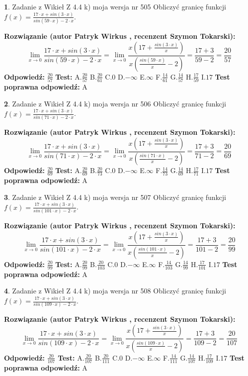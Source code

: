 \documentclass[12pt, a4paper]{article}
\theoremstyle{definition} %
\newtheorem{zad}{}
\newcommand{\zadStart}[1]{\begin{zad}#1\newline}
\newcommand{\zadStop}{\end{zad}}
\newcommand{\rozwStart}[2]{\noindent \textbf{Rozwiązanie (autor #1 , recenzent #2): }\newline}
\newcommand{\rozwStop}{\newline}
\newcommand{\odpStart}{\noindent \textbf{Odpowiedź:}\newline}
\newcommand{\odpStop}{\newline}
\newcommand{\testStart}{\noindent \textbf{Test:}\newline}
\newcommand{\testStop}{\newline}
\newcommand{\kluczStart}{\noindent \textbf{Test poprawna odpowiedź:}\newline}
\newcommand{\kluczStop}{\newline}
\begin{document}
\zadStart{Zadanie z Wikieł Z 4.4 k) moja wersja nr 505}
Obliczyć granicę funkcji $f(x)=\frac{17\cdot x +sin(3\cdot x)}{sin(59\cdot x) -2\cdot x}$.
\zadStop
\rozwStart{Patryk Wirkus}{Szymon Tokarski}
$$\lim\limits_{x\to 0}\frac{17\cdot x +sin(3\cdot x)}{sin(59\cdot x) -2\cdot x}
=\lim\limits_{x\to 0}\frac{x(17+\frac{sin(3\cdot x)}{x})}{x(\frac{sin(59\cdot x)}{x}-2)}
=\frac{17+3}{59-2} = \frac{20}{57}$$
\rozwStop
\odpStart
$\frac{20}{57}$
\odpStop
\testStart
A.$\frac{20}{57}$
B.$\frac{20}{61}$
C.$0$
D.$-\infty$
E.$\infty$
F.$\frac{14}{61}$
G.$\frac{14}{57}$
H.$\frac{17}{59}$
I.$17$
\testStop
\kluczStart
A
\kluczStop



\zadStart{Zadanie z Wikieł Z 4.4 k) moja wersja nr 506}
Obliczyć granicę funkcji $f(x)=\frac{17\cdot x +sin(3\cdot x)}{sin(71\cdot x) -2\cdot x}$.
\zadStop
\rozwStart{Patryk Wirkus}{Szymon Tokarski}
$$\lim\limits_{x\to 0}\frac{17\cdot x +sin(3\cdot x)}{sin(71\cdot x) -2\cdot x}
=\lim\limits_{x\to 0}\frac{x(17+\frac{sin(3\cdot x)}{x})}{x(\frac{sin(71\cdot x)}{x}-2)}
=\frac{17+3}{71-2} = \frac{20}{69}$$
\rozwStop
\odpStart
$\frac{20}{69}$
\odpStop
\testStart
A.$\frac{20}{69}$
B.$\frac{20}{73}$
C.$0$
D.$-\infty$
E.$\infty$
F.$\frac{14}{73}$
G.$\frac{14}{69}$
H.$\frac{17}{71}$
I.$17$
\testStop
\kluczStart
A
\kluczStop



\zadStart{Zadanie z Wikieł Z 4.4 k) moja wersja nr 507}
Obliczyć granicę funkcji $f(x)=\frac{17\cdot x +sin(3\cdot x)}{sin(101\cdot x) -2\cdot x}$.
\zadStop
\rozwStart{Patryk Wirkus}{Szymon Tokarski}
$$\lim\limits_{x\to 0}\frac{17\cdot x +sin(3\cdot x)}{sin(101\cdot x) -2\cdot x}
=\lim\limits_{x\to 0}\frac{x(17+\frac{sin(3\cdot x)}{x})}{x(\frac{sin(101\cdot x)}{x}-2)}
=\frac{17+3}{101-2} = \frac{20}{99}$$
\rozwStop
\odpStart
$\frac{20}{99}$
\odpStop
\testStart
A.$\frac{20}{99}$
B.$\frac{20}{103}$
C.$0$
D.$-\infty$
E.$\infty$
F.$\frac{14}{103}$
G.$\frac{14}{99}$
H.$\frac{17}{101}$
I.$17$
\testStop
\kluczStart
A
\kluczStop



\zadStart{Zadanie z Wikieł Z 4.4 k) moja wersja nr 508}
Obliczyć granicę funkcji $f(x)=\frac{17\cdot x +sin(3\cdot x)}{sin(109\cdot x) -2\cdot x}$.
\zadStop
\rozwStart{Patryk Wirkus}{Szymon Tokarski}
$$\lim\limits_{x\to 0}\frac{17\cdot x +sin(3\cdot x)}{sin(109\cdot x) -2\cdot x}
=\lim\limits_{x\to 0}\frac{x(17+\frac{sin(3\cdot x)}{x})}{x(\frac{sin(109\cdot x)}{x}-2)}
=\frac{17+3}{109-2} = \frac{20}{107}$$
\rozwStop
\odpStart
$\frac{20}{107}$
\odpStop
\testStart
A.$\frac{20}{107}$
B.$\frac{20}{111}$
C.$0$
D.$-\infty$
E.$\infty$
F.$\frac{14}{111}$
G.$\frac{14}{107}$
H.$\frac{17}{109}$
I.$17$
\testStop
\kluczStart
A
\kluczStop
\end{document}
